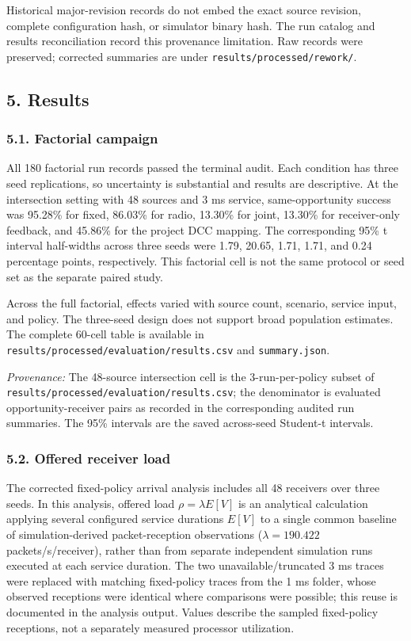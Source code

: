 \documentclass[
]{article}
\begin{document}
Historical major-revision records do not embed the exact source
revision, complete configuration hash, or simulator binary hash. The run
catalog and results reconciliation record this provenance limitation.
Raw records were preserved; corrected summaries are under
\texttt{results/processed/rework/}.

\subsection{5. Results}\label{results}

\subsubsection{5.1. Factorial campaign}\label{factorial-campaign}

All 180 factorial run records passed the terminal audit. Each condition
has three seed replications, so uncertainty is substantial and results
are descriptive. At the intersection setting with 48 sources and 3 ms
service, same-opportunity success was 95.28\% for fixed, 86.03\% for
radio, 13.30\% for joint, 13.30\% for receiver-only feedback, and
45.86\% for the project DCC mapping. The corresponding 95\% t interval
half-widths across three seeds were 1.79, 20.65, 1.71, 1.71, and 0.24
percentage points, respectively. This factorial cell is not the same
protocol or seed set as the separate paired study.

Across the full factorial, effects varied with source count, scenario,
service input, and policy. The three-seed design does not support broad
population estimates. The complete 60-cell table is available in
\texttt{results/processed/evaluation/results.csv} and
\texttt{summary.json}.

\emph{Provenance:} The 48-source intersection cell is the
3-run-per-policy subset of
\texttt{results/processed/evaluation/results.csv}; the denominator is
evaluated opportunity-receiver pairs as recorded in the corresponding
audited run summaries. The 95\% intervals are the saved across-seed
Student-t intervals.

\subsubsection{5.2. Offered receiver load}\label{offered-receiver-load}

The corrected fixed-policy arrival analysis includes all 48 receivers
over three seeds. In this analysis, offered load \(\rho = \lambda E[V]\)
is an analytical calculation applying several configured service
durations \(E[V]\) to a single common baseline of simulation-derived
packet-reception observations (\(\lambda = 190.422\)
packets/s/receiver), rather than from separate independent simulation
runs executed at each service duration. The two unavailable/truncated 3
ms traces were replaced with matching fixed-policy traces from the 1 ms
folder, whose observed receptions were identical where comparisons were
possible; this reuse is documented in the analysis output. Values
describe the sampled fixed-policy receptions, not a separately measured
processor utilization.
\end{document}
